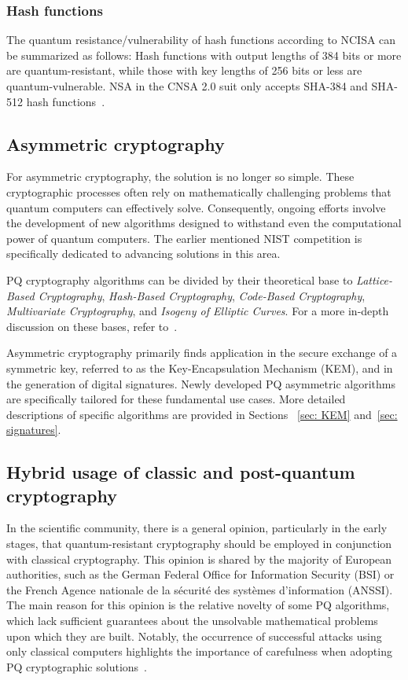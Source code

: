 \subsubsection{Hash functions}

The quantum resistance/vulnerability of hash functions according to NCISA can be summarized as follows: Hash functions with output lengths of 384 bits or more are quantum-resistant, while those with key lengths of 256 bits or less are quantum-vulnerable. NSA in the CNSA 2.0 suit only accepts SHA-384 and SHA-512 hash functions~\cite{NUKIB.min.attachment}.

\subsection{Asymmetric cryptography}

For asymmetric cryptography, the solution is no longer so simple. These cryptographic processes often rely on mathematically challenging problems that quantum computers can effectively solve. Consequently, ongoing efforts involve the development of new algorithms designed to withstand even the computational power of quantum computers. The earlier mentioned NIST competition is specifically dedicated to advancing solutions in this area. 

PQ cryptography algorithms can be divided by their theoretical base to \emph{Lattice-Based Cryptography}, \emph{Hash-Based Cryptography}, \emph{Code-Based Cryptography}, \emph{Multivariate Cryptography}, and \emph{Isogeny of Elliptic Curves}. For a more in-depth discussion on these bases, refer to~\cite{pqc.survey.7030040,pq.blockchain.survey.10288193}.

Asymmetric cryptography primarily finds application in the secure exchange of a symmetric key, referred to as the Key-Encapsulation Mechanism (KEM), and in the generation of digital signatures. Newly developed PQ asymmetric algorithms are specifically tailored for these fundamental use cases. More detailed descriptions of specific algorithms are provided in Sections ~\ref{sec: KEM} and~\ref{sec: signatures}.

\subsection{Hybrid usage of classic and post-quantum cryptography}

In the scientific community, there is a general opinion, particularly in the early stages, that quantum-resistant cryptography should be employed in conjunction with classical cryptography. This opinion is shared by the majority of European authorities, such as the German Federal Office for Information Security (BSI) or the French Agence nationale de la sécurité des systèmes d'information (ANSSI). The main reason for this opinion is the relative novelty of some PQ algorithms, which lack sufficient guarantees about the unsolvable mathematical problems upon which they are built. Notably, the occurrence of successful attacks using only classical computers highlights the importance of carefulness when adopting PQ cryptographic solutions~\cite{NUKIB.min.attachment}.

